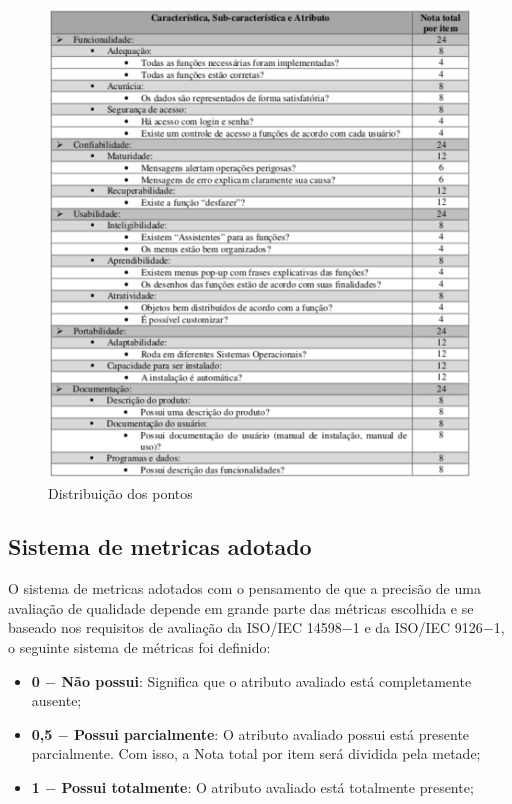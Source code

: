   \begin{figure}[!h]
    \centering
    \includegraphics[width=15cm, keepaspectratio=true]{figuras/ferramentas/pontos.eps}
    \caption{Distribuição dos pontos}
  \end{figure}

\subsection{Sistema de metricas adotado}

  O sistema de metricas adotados com o pensamento de que  a precisão de uma avaliação de qualidade depende em grande parte das métricas
  escolhida e se baseado nos requisitos de avaliação da ISO/IEC 14598$-$1 e da ISO/IEC 9126$-$1, o seguinte sistema de métricas foi definido:

  \begin{itemize}
    \item \textbf{0 $-$ Não possui}: Significa que o atributo avaliado está completamente ausente;
    \item \textbf{0,5 $-$ Possui parcialmente}: O atributo avaliado possui está presente parcialmente. Com isso, a Nota total por item
      será dividida pela metade;
    \item \textbf{1 $-$ Possui totalmente}: O atributo avaliado está totalmente presente;
  \end{itemize}

